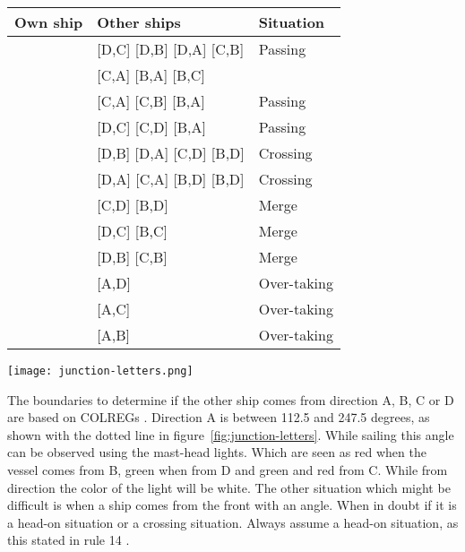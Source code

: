 \begin{minipage}{\textwidth}
	\begin{minipage}[b]{0.62\textwidth}
		\centering
		\begin{tabular}{l|l|l}
			Own ship & Other ships & Situation\\
			\hline
			\big[A,D\big] & [D,C] [D,B] [D,A] [C,B] & Passing \\
						  & [C,A] [B,A] [B,C] & \\
			\big[A,C\big] & [C,A] [C,B] [B,A] & Passing \\
			\big[A,B\big] & [D,C] [C,D] [B,A] & Passing \\
			\big[A,C\big] & [D,B] [D,A] [C,D] [B,D] & Crossing \\
			\big[A,B\big] & [D,A] [C,A] [B,D] [B,D] & Crossing \\
			\big[A,D\big] & [C,D] [B,D] & Merge \\
			\big[A,C\big] & [D,C] [B,C] & Merge \\
			\big[A,B\big] & [D,B] [C,B] & Merge \\
			\big[A,D\big] & [A,D] & Over-taking \\
			\big[A,C\big] & [A,C] & Over-taking \\
			\big[A,B\big] & [A,B] & Over-taking \\
		\end{tabular}
		\label{tab:scenarios-standard}
	\end{minipage}
	\hfill
	\begin{minipage}[b]{0.37\textwidth}
		\centering
		\texttt{[image: junction-letters.png]}
		\label{fig:junction-letters}
	\end{minipage}
\end{minipage}

The boundaries to determine if the other ship comes from direction A, B, C or D are based on \ac{COLREGs} \cite{IMO1972}. Direction A is between 112.5 and 247.5 degrees, as shown with the dotted line in figure~\ref{fig:junction-letters}. While sailing this angle can be observed using the mast-head lights. Which are seen as red when the vessel comes from B, green when from D and green and red from C. While from direction the color of the light will be white. The other situation which might be difficult is when a ship comes from the front with an angle. When in doubt if it is a head-on situation or a crossing situation. Always assume a head-on situation, as this stated in rule 14 \cite{IMO1972}.

